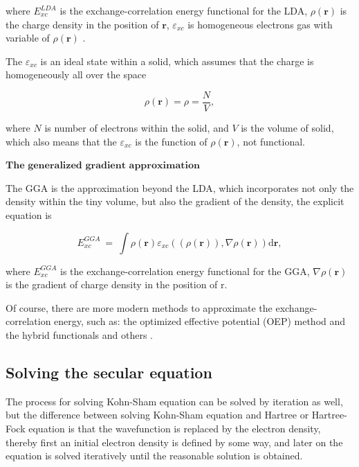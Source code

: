 \documentclass[a4paper, 12pt, titlepage,oneside,drop]{kthesis}
\begin{document}
where $ E^\textit{LDA}_\textit{xc} $ is the exchange-correlation energy functional for the LDA, $\rho(\textbf{r})$ is the charge density in the position of $\textbf{r}$, $\varepsilon_\textit{xc}$ is homogeneous 
electrons gas with variable of  $\rho(\textbf{r})$ .

The $\varepsilon_\textit{xc}$ is an ideal state within a solid, which assumes that the charge is homogeneously all over the space

\begin{equation}
 \rho(\textbf{r}) = \rho = \frac{N}{V},
\end{equation}

where $N$ is number of electrons within the solid, and $V$ is the volume of solid, which also means that the $\varepsilon_\textit{xc}$ is the function of $\rho(\textbf{r})$,
 not functional. 

$\textbf{The generalized gradient approximation}$

The GGA is the approximation beyond the LDA, which incorporates not only the density within the tiny volume, but also the gradient
 of the density, the explicit equation is

\begin{equation}
E^{\textit{GGA}}_{\textit{xc}}\ = \ \int \rho(\textbf{r}) \varepsilon_\textit{xc}( (\rho(\textbf{r})), \nabla \rho(\textbf{r}) ) \mathrm{d} \textbf{r}, 
\end{equation}

where $E^{\textit{GGA}}_{\textit{xc}}$ is the exchange-correlation energy functional for the GGA, $\nabla \rho(\textbf{r})$ is the gradient  of charge density in the position of r.

Of course, there are more modern methods to approximate the exchange-correlation energy, such as: the optimized effective potential
(OEP) method and the hybrid functionals and others			.

\subsection{Solving the secular equation}

The process for solving Kohn-Sham equation can be solved by iteration as well, but the difference between solving Kohn-Sham 
equation and Hartree or Hartree-Fock equation is that the wavefunction is replaced by the electron density, thereby first an initial 
electron density is defined by some way, and later on the equation is solved iteratively until the reasonable solution is obtained.
\end{document}
